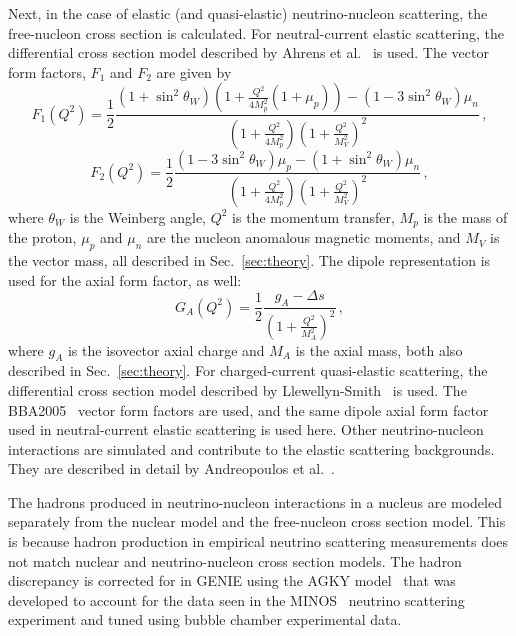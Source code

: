     Next, in the case of elastic (and quasi-elastic) neutrino-nucleon
    scattering, the free-nucleon cross section is calculated. For
    neutral-current elastic scattering, the differential cross section model
    described by Ahrens et al.~\cite{Ahrens} is used. The vector form
    factors, $F_1$ and $F_2$ are given by
    \begin{equation}
      F_1(Q^2) = \frac{1}{2}\frac{(1+\sin^2\theta_W)(1+\frac{Q^2}{4M_p^2}(1+\mu_p)) 
        - (1-3\sin^2\theta_W)\mu_n}
        {(1+\frac{Q^2}{4M_p^2})(1+\frac{Q^2}{M_V^2})^2} \,,
    \end{equation}
    \begin{equation}
      F_2(Q^2) = \frac{1}{2}\frac{(1-3\sin^2\theta_W)\mu_p - (1+\sin^2\theta_W)\mu_n}
         {(1+\frac{Q^2}{4M_p^2})(1+\frac{Q^2}{M_V^2})^2} \,,
    \end{equation}
    where $\theta_W$ is the Weinberg angle, $Q^2$ is the momentum transfer,
    $M_p$ is the mass of the proton, $\mu_p$ and $\mu_n$ are the nucleon
    anomalous magnetic moments, and $M_V$ is the vector mass, all described in
    Sec.~\ref{sec:theory}. The dipole representation is used for the axial
    form factor, as well:
    \begin{equation}
      G_A(Q^2) = \frac{1}{2}\frac{g_A - \Delta s}{(1+\frac{Q^2}{M_A^2})^2} \,,
    \end{equation}
    where $g_A$ is the isovector axial charge and $M_A$ is the axial mass, both
    also described in Sec.~\ref{sec:theory}. For charged-current quasi-elastic
    scattering, the differential cross section model described by
    Llewellyn-Smith~\cite{Llewellyn} is used. The BBA2005~\cite{BBA05} vector
    form factors are used, and the same dipole axial form factor used in
    neutral-current elastic scattering is used here. Other neutrino-nucleon
    interactions are simulated and contribute to the elastic scattering
    backgrounds. They are described in detail by Andreopoulos et
    al.~\cite{Andreopoulos:2015wxa}.

    The hadrons produced in neutrino-nucleon interactions in a nucleus are
    modeled separately from the nuclear model and the free-nucleon cross
    section model. This is because hadron production in empirical neutrino
    scattering measurements does not match nuclear and neutrino-nucleon cross
    section models. The hadron discrepancy is corrected for in GENIE using the
    AGKY model~\cite{AGKY} that was developed to account for the data seen in
    the MINOS~\cite{MINOS} neutrino scattering experiment and tuned using
    bubble chamber experimental data.

